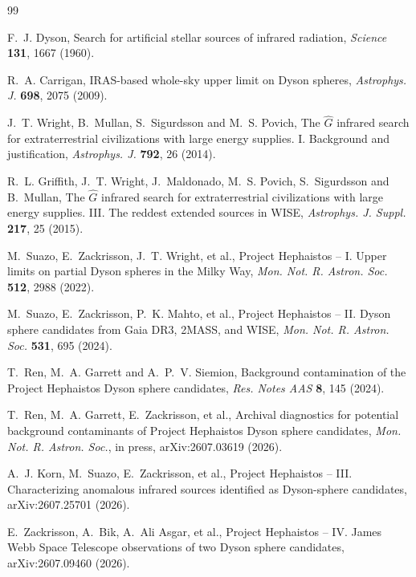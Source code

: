 \documentclass[3p,11pt]{elsarticle}
\begin{document}
\begin{thebibliography}{99}\small\raggedright
\setlength{\itemsep}{1pt}

F.~J. Dyson, Search for artificial stellar sources of infrared radiation, \emph{Science}
\textbf{131}, 1667 (1960).

R.~A. Carrigan, IRAS-based whole-sky upper limit on Dyson spheres, \emph{Astrophys. J.}
\textbf{698}, 2075 (2009).

J.~T. Wright, B.~Mullan, S.~Sigurdsson and M.~S. Povich, The $\hat{G}$ infrared search
for extraterrestrial civilizations with large energy supplies. I. Background and
justification, \emph{Astrophys. J.} \textbf{792}, 26 (2014).

R.~L. Griffith, J.~T. Wright, J.~Maldonado, M.~S. Povich, S.~Sigurdsson and B.~Mullan,
The $\hat{G}$ infrared search for extraterrestrial civilizations with large energy
supplies. III. The reddest extended sources in WISE, \emph{Astrophys. J. Suppl.}
\textbf{217}, 25 (2015).

M.~Suazo, E.~Zackrisson, J.~T. Wright, et al., Project Hephaistos -- I. Upper limits on
partial Dyson spheres in the Milky Way, \emph{Mon. Not. R. Astron. Soc.} \textbf{512},
2988 (2022).

M.~Suazo, E.~Zackrisson, P.~K. Mahto, et al., Project Hephaistos -- II. Dyson sphere
candidates from Gaia DR3, 2MASS, and WISE, \emph{Mon. Not. R. Astron. Soc.}
\textbf{531}, 695 (2024).

T.~Ren, M.~A. Garrett and A.~P.~V. Siemion, Background contamination of the Project
Hephaistos Dyson sphere candidates, \emph{Res. Notes AAS} \textbf{8}, 145 (2024).

T.~Ren, M.~A. Garrett, E.~Zackrisson, et al., Archival diagnostics for potential
background contaminants of Project Hephaistos Dyson sphere candidates, \emph{Mon. Not.
R. Astron. Soc.}, in press, arXiv:2607.03619 (2026).

A.~J. Korn, M.~Suazo, E.~Zackrisson, et al., Project Hephaistos -- III. Characterizing
anomalous infrared sources identified as Dyson-sphere candidates, arXiv:2607.25701
(2026).

E.~Zackrisson, A.~Bik, A.~Ali Asgar, et al., Project Hephaistos -- IV. James Webb Space
Telescope observations of two Dyson sphere candidates, arXiv:2607.09460 (2026).


\end{thebibliography}
\end{document}
